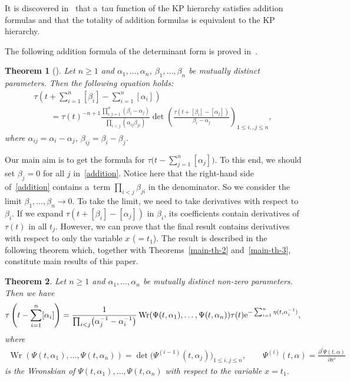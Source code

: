 \documentclass[pdftex]{sigma}
\numberwithin{equation}{section}
\newtheorem{Theorem}{Theorem}[section]
\theoremstyle{definition}
\begin{document}
It is discovered in~\cite{SS} that a~tau function of the KP hierarchy
satisfies addition formulas and that the totality of addition formulas is equivalent to the KP hierarchy.


The following addition formula of the determinant form is proved in~\cite{Shigyo2013}.

\begin{Theorem}[\cite{Shigyo2013}]
Let $n\geq 1$ and $\alpha_1,\dots ,\alpha_n$, $\beta_1,\dots ,\beta_n$ be mutually distinct parameters.
Then the following equation holds:
\begin{gather}
\tau\left(t+\sum_{i=1}^n[\beta_i]-\sum_{i=1}^n[\alpha_i]\right)\nonumber\\
\qquad
=\tau(t)^{-n+1}
\frac{\prod_{i,j=1}^n(\beta_i-\alpha_j)}{\prod_{i<j}(\alpha_{ij}\beta_{ji})}
\det\left(\frac{\tau(t+[\beta_i]-[\alpha_j])}{\beta_i-\alpha_j}\right)_{1\leq i,,j\leq n},
\label{addition}
\end{gather}
where $\alpha_{ij}=\alpha_i-\alpha_j$, $\beta_{ij}=\beta_i-\beta_j$.
\end{Theorem}

Our main aim is to get the formula for $ \tau\bigl(t-\sum_{j=1}^n[\alpha_j]\bigr)$.
To this end, we should set $\beta_j=0$ for all $j$ in~\eqref{addition}.
Notice here that the right-hand side of~\eqref{addition} contains a~term $\prod_{i<j}\beta_{ji}$ in the denominator. So we consider the limit $\beta_1,\dots ,\beta_n \to 0$.
To take the limit, we need to take derivatives with respect to $\beta_i$.
If we expand $\tau(t+[\beta_i]-[\alpha_j])$
in $\beta_i$, its coefficients contain derivatives of $\tau(t)$ in all $t_j$.
However, we can prove that the final result contains derivatives with respect to only the variable $x$ ($=t_1$). The result is described in the following theorem which,
together with Theorems~\ref{main-th-2} and~\ref{main-th-3}, constitute
 main results of this paper.

\begin{Theorem}\label{main-th}
Let $n\geq 1$ and $\alpha_1,\dots ,\alpha_n$ be mutually distinct non-zero parameters. Then we have
\[
\tau\left(t-\sum_{i=1}^n[\alpha_i]\right)
=\frac{1}{\prod_{i<j}\bigl(\alpha_j^{-1}-\alpha_i^{-1}\bigr)}
\operatorname{Wr}(\Psi(t,\alpha_1),\dots ,\Psi(t,\alpha_n))\tau(t){\rm e}^{-\sum_{i=1}^n\eta(t,\alpha_i^{-1})},
\]
where
\begin{gather*}
\operatorname{Wr}(\Psi(t,\alpha_1),\dots ,\Psi(t,\alpha_n))=\det\bigl(\Psi^{(i-1)}(t,\alpha_j)\bigr)_{1\leq i,j\leq n},
\qquad
\Psi^{(i)}(t,\alpha)=\frac{\partial^i \Psi(t,\alpha)}{\partial x^i}
\end{gather*}
is the Wronskian of $\Psi(t,\alpha_1),\dots ,\Psi(t,\alpha_n)$ with respect to the variable $x=t_1$.
\end{Theorem}
\end{document}
